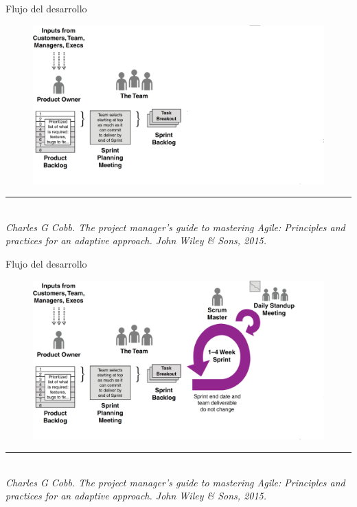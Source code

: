 \documentclass[10pt,xcolor=table ]{beamer}
\newcommand{\decoRule}{\rule{\textwidth}{.4pt}} %
\begin{document}
\begin{frame}{Flujo del desarrollo}
	\begin{figure}
		\centering
	    \includegraphics[scale=0.235]{../Figuras/flujo_scrum_2}
	\end{figure}
	\decoRule \\
  	\tiny \textit{Charles G Cobb. The project manager’s guide to mastering Agile: Principles and practices for an adaptive approach. John Wiley \& Sons, 2015.} \\
\end{frame}

\begin{frame}{Flujo del desarrollo}
	\begin{figure}
		\centering
	    \includegraphics[scale=0.235]{../Figuras/flujo_scrum_3}
	\end{figure}
	\decoRule \\
  	\tiny \textit{Charles G Cobb. The project manager’s guide to mastering Agile: Principles and practices for an adaptive approach. John Wiley \& Sons, 2015.} \\
\end{frame}
\end{document}
